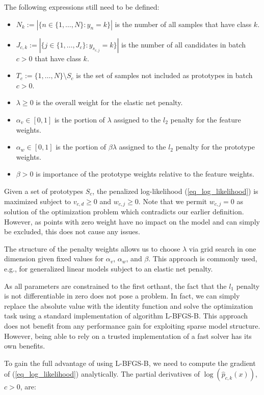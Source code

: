 %
The following expressions still need to be defined:
%
\begin{itemize}
\item $N_k:=\left|\{n\in\{1,\dots,N\}:y_n=k\}\right|$ is the number of all samples that have class $k$.
%
\item $J_{c,k}:=\left|\{j\in\{1,\dots,J_c\}:y_{s_{c,j}}=k\}\right|$
is the number of all candidates in batch $c>0$ that have class $k$.
%
\item $T_c:=\{1,\dots,N\}\setminus S_c$ is the set of samples not included as prototypes in batch $c>0$.
%
\item $\lambda\geq0$ is the overall weight for the elastic net penalty.
%
\item $\alpha_v\in[0,1]$ is the portion of $\lambda$ assigned to the $l_2$ penalty for the feature weights.
%
\item $\alpha_w\in[0,1]$ is the portion of $\beta\lambda$ assigned to the $l_2$ penalty for the prototype weights.
%
\item $\beta>0$ is importance of the prototype weights relative to the feature weights.
\end{itemize}
%
Given a set of prototypes $S_c$, the penalized log-likelihood (\ref{eq_log_likelihood}) is maximized subject to $v_{c,d}\geq0$ and $w_{c,j}\geq0$.
Note that we permit $w_{c,j}=0$ as solution of the optimization problem which contradicts our earlier definition.
However, as points with zero weight have no impact on the model and can simply be excluded, this does not cause any issues.\par
%
The structure of the penalty weights allows us to choose $\lambda$ via grid search in one dimension given fixed values for $\alpha_v$, $\alpha_w$, and $\beta$.
This approach is commonly used, e.g., for generalized linear models subject to an elastic net penalty.\par
%
As all parameters are constrained to the first orthant, the fact that the $l_1$ penalty is not differentiable in zero does not pose a problem.
In fact, we can simply replace the absolute value with the identity function and solve the optimization task using a standard implementation of algorithm L-BFGS-B.
This approach does not benefit from any performance gain for exploiting sparse model structure.
However, being able to rely on a trusted implementation of a fast solver has its own benefits.\par
%
To gain the full advantage of using L-BFGS-B, we need to compute the gradient of (\ref{eq_log_likelihood}) analytically.
The partial derivatives of $\log(\hat{p}_{c,k}(x))$, $c>0$, are:

